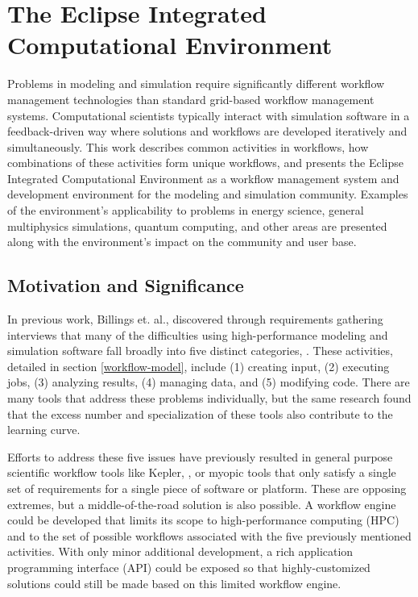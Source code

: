 \chapter{The Eclipse Integrated Computational Environment}

Problems in modeling and simulation require significantly different
workflow management technologies than standard grid-based workflow
management systems. Computational scientists typically interact with
simulation software in a feedback-driven way where solutions and
workflows are developed iteratively and simultaneously. This work
describes common activities in workflows, how combinations of these
activities form unique workflows, and presents the Eclipse Integrated
Computational Environment as a workflow management system and
development environment for the modeling and simulation community.
Examples of the environment's applicability to problems in energy
science, general multiphysics simulations, quantum computing, and other
areas are presented along with the environment's impact on the community
and user base.

\section{Motivation and Significance}\label{motivation-and-significance}

In previous work, Billings et. al., discovered through requirements
gathering interviews that many of the difficulties using
high-performance modeling and simulation software fall broadly into five
distinct categories, \cite{billings_designing_2009}. These activities,
detailed in section \ref{workflow-model}, include (1) creating input,
(2) executing jobs, (3) analyzing results, (4) managing data, and (5)
modifying code. There are many tools that address these problems
individually, but the same research found that the excess number and
specialization of these tools also contribute to the learning curve.

Efforts to address these five issues have previously resulted in general
purpose scientific workflow tools like Kepler, 
\cite{ludascher_scientific_2006}, or myopic tools that only satisfy a single
set of requirements for a single piece of software or platform. These
are opposing extremes, but a middle-of-the-road solution is also
possible. A workflow engine could be developed that limits its scope to
high-performance computing (HPC) and to the set of possible workflows
associated with the five previously mentioned activities. With only
minor additional development, a rich application programming interface
(API) could be exposed so that highly-customized solutions could still
be made based on this limited workflow engine.

